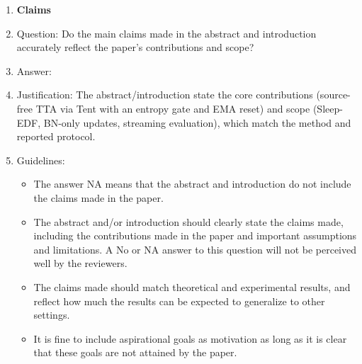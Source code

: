 \documentclass{article}
\begin{document}
\begin{enumerate}

\item {\bf Claims}
    \item[] Question: Do the main claims made in the abstract and introduction accurately reflect the paper's contributions and scope?
    \item[] Answer: \answerYes{}
    \item[] Justification: The abstract/introduction state the core contributions (source-free TTA via Tent with an entropy gate and EMA reset) and scope (Sleep-EDF, BN-only updates, streaming evaluation), which match the method and reported protocol.
    \item[] Guidelines:
    \begin{itemize}
        \item The answer NA means that the abstract and introduction do not include the claims made in the paper.
        \item The abstract and/or introduction should clearly state the claims made, including the contributions made in the paper and important assumptions and limitations. A No or NA answer to this question will not be perceived well by the reviewers. 
        \item The claims made should match theoretical and experimental results, and reflect how much the results can be expected to generalize to other settings. 
        \item It is fine to include aspirational goals as motivation as long as it is clear that these goals are not attained by the paper. 
    \end{itemize}


\end{enumerate}
\end{document}
